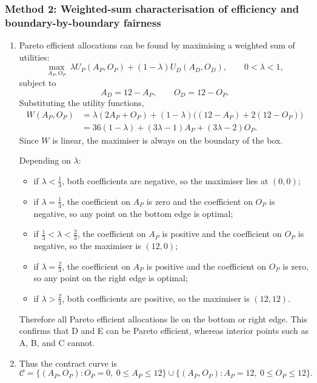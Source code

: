 \documentclass[12pt]{article}
\begin{document}
\subsubsection{Method 2: Weighted-sum characterisation of efficiency and boundary-by-boundary fairness}

\begin{enumerate}[label=(\alph*)]
    \item
    Pareto efficient allocations can be found by maximising a weighted sum of utilities:
    \[
    \max_{A_P,O_P}\;
    \lambda U_P(A_P,O_P)+(1-\lambda)U_D(A_D,O_D),
    \qquad 0<\lambda<1,
    \]
    subject to
    \[
    A_D=12-A_P,\qquad O_D=12-O_P.
    \]
    Substituting the utility functions,
    \begin{align*}
        W(A_P,O_P)
        &=\lambda(2A_P+O_P)+(1-\lambda)\bigl((12-A_P)+2(12-O_P)\bigr)\\
        &=36(1-\lambda) + (3\lambda-1)A_P + (3\lambda-2)O_P.
    \end{align*}
    Since \(W\) is linear, the maximiser is always on the boundary of the box.

    Depending on \(\lambda\):
    \begin{itemize}[leftmargin=*]
        \item if \(\lambda<\tfrac13\), both coefficients are negative, so the maximiser lies at \((0,0)\);
        \item if \(\lambda=\tfrac13\), the coefficient on \(A_P\) is zero and the coefficient on \(O_P\) is negative, so any point on the bottom edge is optimal;
        \item if \(\tfrac13<\lambda<\tfrac23\), the coefficient on \(A_P\) is positive and the coefficient on \(O_P\) is negative, so the maximiser is \((12,0)\);
        \item if \(\lambda=\tfrac23\), the coefficient on \(A_P\) is positive and the coefficient on \(O_P\) is zero, so any point on the right edge is optimal;
        \item if \(\lambda>\tfrac23\), both coefficients are positive, so the maximiser is \((12,12)\).
    \end{itemize}
    Therefore all Pareto efficient allocations lie on the bottom or right edge. This confirms that D and E can be Pareto efficient, whereas interior points such as A, B, and C cannot.

    \item
    Thus the contract curve is
    \[
    \boxed{\mathcal C
    =\{(A_P,O_P): O_P=0,\ 0\le A_P\le 12\}
    \cup
    \{(A_P,O_P): A_P=12,\ 0\le O_P\le 12\}.}
    \]


\end{enumerate}
\end{document}
